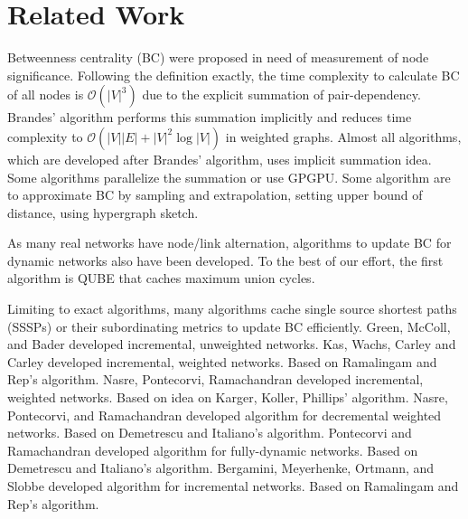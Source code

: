 \documentclass[twocolumn]{article}
\begin{document}
  \section{Related Work}
  Betweenness centrality (BC) were proposed in need of measurement of node significance\cite{Freeman1977}.
  Following the definition exactly, the time complexity to calculate BC of all nodes is $\mathcal{O}(\lvert V\rvert^3)$ due to the explicit summation of pair-dependency.
  Brandes' algorithm\cite{Brandes2001} performs this summation implicitly and reduces time complexity to $\mathcal{O}(\lvert V\rvert\lvert E\rvert+\lvert V\rvert^2\log\lvert V\rvert)$ in weighted graphs.
  Almost all algorithms, which are developed after Brandes' algorithm, uses implicit summation idea. Some algorithms parallelize the summation\cite{Bader2006,Tan2009,Edmonds2010} or use GPGPU\cite{Shi2011,Sariyuce2013,Bernaschi2016}. Some algorithm are to approximate BC by sampling and extrapolation\cite{Brandes2007,Bader2007,Geisberger2008,Chehreghani2014,Riondato2014,Riondato2016,Borassi2019}, setting upper bound of distance\cite{Pfeffer2012}, using hypergraph sketch\cite{Yoshida2014}.

  As many real networks have node/link alternation\cite{Holme2012}, algorithms to update BC for dynamic networks also have been developed.
  To the best of our effort, the first algorithm is QUBE\cite{Lee2012} that caches maximum union cycles.

  Limiting to exact algorithms, many algorithms cache single source shortest paths (SSSPs) or their subordinating metrics to update BC efficiently\cite{Green2012,Kas2013,Nasre2014a,Nasre2014b,Pontecorvi2015,Bergamini2017}.
  Green, McColl, and Bader\cite{Green2012} developed incremental, unweighted networks.
  Kas, Wachs, Carley and Carley\cite{Kas2013} developed incremental, weighted networks. Based on Ramalingam and Rep's algorithm\cite{Ramalingam1996}.
  Nasre, Pontecorvi, Ramachandran\cite{Nasre2014a} developed incremental, weighted networks. Based on idea on Karger, Koller, Phillips' algorithm\cite{Karger1993}.
  Nasre, Pontecorvi, and Ramachandran\cite{Nasre2014b} developed algorithm for decremental weighted networks. Based on Demetrescu and Italiano's algorithm\cite{Demetrescu2003}.
  Pontecorvi and Ramachandran\cite{Pontecorvi2014} developed algorithm for fully-dynamic networks. Based on Demetrescu and Italiano's algorithm.
  Bergamini, Meyerhenke, Ortmann, and Slobbe\cite{Bergamini2017} developed algorithm for incremental networks. Based on Ramalingam and Rep's algorithm.
\end{document}
